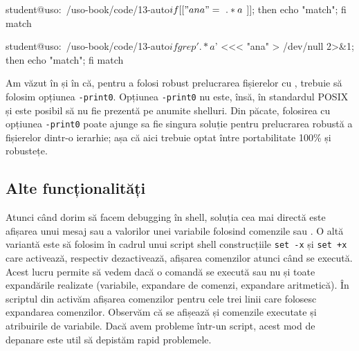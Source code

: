 \begin{screen}[caption={Alternativă la folosirea {[[} (grep)},label={lst:auto:grep-vs-if-brackets}]
student@uso:~/uso-book/code/13-auto$ if [[ "ana" =~ .*a$ ]]; then echo "match"; fi
match

student@uso:~/uso-book/code/13-auto$ if grep '.*a$' <<< "ana" > /dev/null 2>&1; then echo "match"; fi
match
\end{screen}

Am văzut în  și în  că, pentru a folosi robust prelucrarea fișierelor cu , trebuie să folosim opțiunea \texttt{-print0}.
Opțiunea \texttt{-print0} nu este, însă, în standardul POSIX și este posibil să nu fie prezentă pe anumite shelluri.
Din păcate, folosirea  cu opțiunea \texttt{-print0} poate ajunge sa fie singura soluție pentru prelucrarea robustă a fișierelor dintr-o ierarhie; așa că aici trebuie optat între portabilitate 100\% și robustețe.

\subsection{Alte funcționalități}
\label{sec:auto:script-advanced:other}

Atunci când dorim să facem debugging în shell, soluția cea mai directă este afișarea unui mesaj sau a valorilor unei variabile folosind comenzile  sau .
O altă variantă este să folosim în cadrul unui script shell construcțiile \texttt{set -x} și \texttt{set +x} care activează, respectiv dezactivează, afișarea comenzilor atunci când se execută.
Acest lucru permite să vedem dacă o comandă se execută sau nu și toate expandările realizate (variabile, expandare de comenzi, expandare aritmetică).
În scriptul  din  activăm afișarea comenzilor pentru cele trei linii care folosesc expandarea comenzilor.
Observăm că se afișează și comenzile executate și atribuirile de variabile.
Dacă avem probleme într-un script, acest mod de depanare este util să depistăm rapid problemele.


